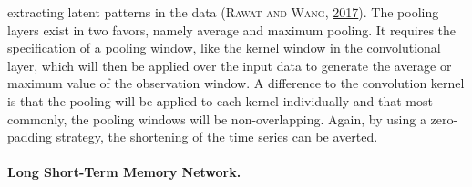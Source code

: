 \documentclass[a4paper,11pt]{article}
\begin{document}
extracting latent patterns in the data \textsc{(\textnormal{\textsc{Rawat} and \textsc{Wang}}, \textnormal{\protect\hyperlink{ref-rawat2017}{2017}})}. The pooling layers exist in two favors,
namely average and maximum pooling. It requires the specification of a pooling
window, like the kernel window in the convolutional layer, which will then
be applied over the input data to generate the average or maximum value of the observation
window. A difference to the convolution kernel is that the pooling will be applied
to each kernel individually and that most commonly, the pooling windows will be
non-overlapping. Again, by using a zero-padding strategy, the shortening of the time series can be averted.

\newpage

\hypertarget{long-short-term-memory-network.}{%
\paragraph{Long Short-Term Memory Network.}\label{long-short-term-memory-network.}}
\end{document}
